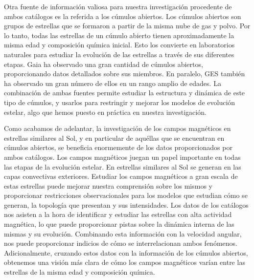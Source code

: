 Otra fuente de información valiosa para nuestra investigación procedente de ambos catálogos es la referida a los cúmulos abiertos. Los cúmulos abiertos son grupos de estrellas que se formaron a partir de la misma nube de gas y polvo. Por lo tanto, todas las estrellas de un cúmulo abierto tienen aproximadamente la misma edad y composición química inicial. Esto los convierte en laboratorios naturales para estudiar la evolución de las estrellas a través de sus diferentes etapas. Gaia ha observado una gran cantidad de cúmulos abiertos, proporcionando datos detallados sobre sus miembros. En paralelo, GES también ha observado un gran número de ellos en un rango amplio de edades. La combinación de ambas fuentes permite estudiar la estructura y dinámica de este tipo de cúmulos, y usarlos para restringir y mejorar los modelos de evolución estelar, algo que hemos puesto en práctica en nuestra investigación.\par

Como acabamos de adelantar, la investigación de los campos magnéticos en estrellas similares al Sol, y en particular de aquéllas que se encuentran en cúmulos abiertos, se beneficia enormemente de los datos proporcionados por ambos catálogos. Los campos magnéticos juegan un papel importante en todas las etapas de la evolución estelar. En estrellas similares al Sol se generan en las capas convectivas exteriores. Estudiar los campos magnéticos a gran escala de estas estrellas puede mejorar nuestra comprensión sobre los mismos y proporcionar restricciones observacionales para los modelos que estudian cómo se generan, la topología que presentan y sus intensidades. Los datos de los catálogos nos asisten a la hora de identificar y estudiar las estrellas con alta actividad magnética, lo que puede proporcionar pistas sobre la dinámica interna de las mismas y su evolución. Combinando esta información con la velocidad angular, nos puede proporcionar indicios de cómo se interrelacionan ambos fenómenos. Adicionalmente, cruzando estos datos con la información de los cúmulos abiertos, obtenemos una visión más clara de cómo los campos magnéticos varían entre las estrellas de la misma edad y composición química.\par


